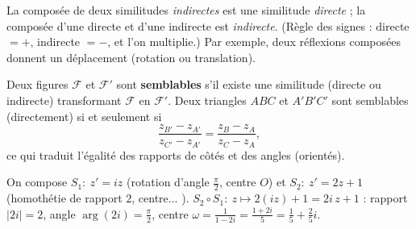 \begin{propriete}
La composée de deux similitudes \emph{indirectes} est une similitude \emph{directe} ; la composée d'une
directe et d'une indirecte est \emph{indirecte}. (Règle des signes : directe $=+$, indirecte $=-$, et l'on
multiplie.) Par exemple, deux réflexions composées donnent un déplacement (rotation ou translation).
\end{propriete}

\begin{definition}
Deux figures $\mathcal F$ et $\mathcal F'$ sont \textbf{semblables} s'il existe une similitude (directe ou indirecte)
transformant $\mathcal F$ en $\mathcal F'$. Deux triangles $ABC$ et $A'B'C'$ sont semblables (directement) si et
seulement si
\[
\frac{z_{B'}-z_{A'}}{z_{C'}-z_{A'}}=\frac{z_B-z_A}{z_C-z_A},
\]
ce qui traduit l'égalité des rapports de côtés et des angles (orientés).
\end{definition}

\begin{illus}
\end{illus}

\begin{exemple}
On compose $S_1:\ z'=iz$ (rotation d'angle $\frac\pi2$, centre $O$) et $S_2:\ z'=2z+1$ (homothétie de
rapport $2$, centre... ). $S_2\circ S_1:\ z\mapsto 2(iz)+1=2i\,z+1$ : rapport $|2i|=2$, angle
$\arg(2i)=\frac\pi2$, centre $\omega=\frac{1}{1-2i}=\frac{1+2i}{5}=\frac15+\frac25 i$.
\end{exemple}

